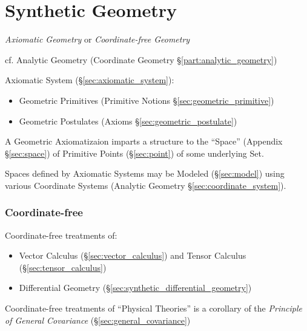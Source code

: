\part{Synthetic Geometry}\label{part:synthetic_geometry}

\emph{Axiomatic Geometry} or \emph{Coordinate-free Geometry}

\fist cf. Analytic Geometry (Coordinate Geometry \S\ref{part:analytic_geometry})

Axiomatic System (\S\ref{sec:axiomatic_system}):
\begin{itemize}
  \item Geometric Primitives (Primitive Notions \S\ref{sec:geometric_primitive})
  \item Geometric Postulates (Axioms \S\ref{sec:geometric_postulate})
\end{itemize}
A Geometric Axiomatizaion imparts a structure to the ``Space'' (Appendix
\S\ref{sec:space}) of Primitive Points (\S\ref{sec:point}) of some underlying
Set.

\fist Spaces defined by Axiomatic Systems may be Modeled (\S\ref{sec:model})
using various Coordinate Systems (Analytic Geometry
\S\ref{sec:coordinate_system}).



\section{Coordinate-free}\label{sec:coordinate_free}

Coordinate-free treatments of:
\begin{itemize}
  \item Vector Calculus (\S\ref{sec:vector_calculus}) and Tensor Calculus
    (\S\ref{sec:tensor_calculus})
  \item Differential Geometry (\S\ref{sec:synthetic_differential_geometry})
\end{itemize}

Coordinate-free treatments of ``Physical Theories'' is a corollary of the
\emph{Principle of General Covariance} (\S\ref{sec:general_covariance})



